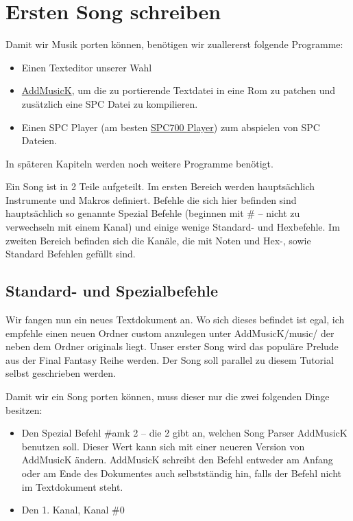 \lstset{language=MML}
\section{Ersten Song schreiben}
\label{sec:ErstenSongSchreiben}

Damit wir Musik porten können, benötigen wir zuallererst folgende Programme:
\begin{itemize}
	\item Einen Texteditor unserer Wahl
	\item \href{https://dl.smwcentral.net/24994/AddmusicK_1.0.8.zip}{AddMusicK}, um die zu portierende Textdatei in eine Rom zu patchen und zusätzlich eine SPC Datei zu kompilieren.
	\item Einen SPC Player (am besten \href{https://dl.smwcentral.net/15205/SPC700\%20PLAYER.zip}{SPC700 Player}) zum abspielen von SPC Dateien.
\end{itemize}

In späteren Kapiteln werden noch weitere Programme benötigt.

\bigskip

Ein Song ist in 2 Teile aufgeteilt. Im ersten Bereich werden hauptsächlich Instrumente und Makros definiert. Befehle die sich hier befinden sind hauptsächlich so genannte Spezial Befehle (beginnen mit \# -- nicht zu verwechseln mit einem Kanal) und einige wenige Standard- und Hexbefehle. Im zweiten Bereich befinden sich die Kanäle, die mit Noten und Hex-, sowie Standard Befehlen gefüllt sind.

\subsection{Standard- und Spezialbefehle}

Wir fangen nun ein neues Textdokument an. Wo sich dieses befindet ist egal, ich empfehle einen neuen Ordner custom anzulegen unter AddMusicK/music/ der neben dem Ordner originals liegt. Unser erster Song wird das populäre Prelude aus der Final Fantasy Reihe werden. Der Song soll parallel zu diesem Tutorial selbst geschrieben werden.

\bigskip

Damit wir ein Song porten können, muss dieser nur die zwei folgenden Dinge besitzen:
\begin{itemize}
	\item Den Spezial Befehl \#amk 2 -- die 2 gibt an, welchen Song Parser AddMusicK benutzen soll. Dieser Wert kann sich mit einer neueren Version von AddMusicK ändern. AddMusicK schreibt den Befehl entweder am Anfang oder am Ende des Dokumentes auch selbstständig hin, falls der Befehl nicht im Textdokument steht.
	\item Den 1. Kanal, Kanal \#0
\end{itemize}

